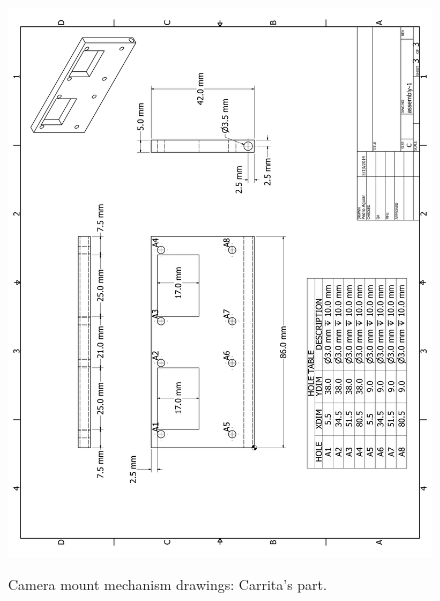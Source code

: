 \begin{figure}[ht!]
\begin{center}
\includegraphics[height=1.2\textwidth]{fig/cammountp3}\\
\caption{Camera mount mechanism drawings: Carrita's part.}
\label{fig_cammountp3}
\end{center}
\end{figure}
